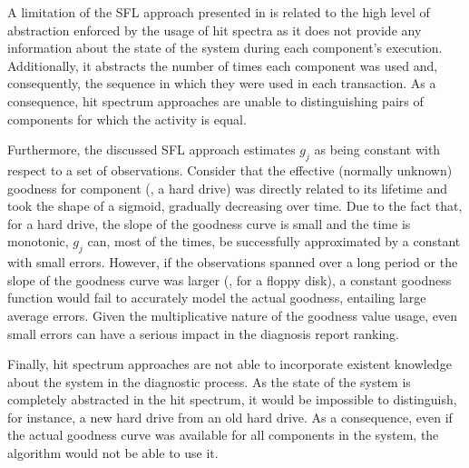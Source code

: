 A limitation of the \ac{SFL} approach presented in
 is related to the high level of
abstraction enforced by the usage of hit spectra as it does not
provide any information about the state of the system during each
component's execution.
%
Additionally, it abstracts the number of times each component was used
and, consequently, the sequence in which they were used in each
transaction.
%
As a consequence, hit spectrum approaches are unable to distinguishing
pairs of components for which the activity is equal.

Furthermore, the discussed \ac{SFL} approach estimates $g_j$ as being
constant with respect to a set of observations.
%
Consider that the effective (normally unknown) goodness for component
(\eg, a hard drive) was directly related to its lifetime and took
the shape of a sigmoid, gradually decreasing over time.
%
Due to the fact that, for a hard drive, the slope of the goodness
curve is small and the time is monotonic, $g_j$ can, most of the
times, be successfully approximated by a constant with small errors.
%
However, if the observations spanned over a long period or the slope
of the goodness curve was larger (\eg, for a floppy disk), a constant
goodness function would fail to accurately model the actual goodness,
entailing large average errors.
%
Given the multiplicative nature of the goodness value usage, even
small errors can have a serious impact in the diagnosis report
ranking.

Finally, hit spectrum approaches are not able to incorporate existent
knowledge about the system in the diagnostic process.
%
As the state of the system is completely abstracted in the hit
spectrum, it would be impossible to distinguish, for instance, a new
hard drive from an old hard drive.
%
As a consequence, even if the actual goodness curve was available for
all components in the system, the algorithm would not be able to use
it.

%


